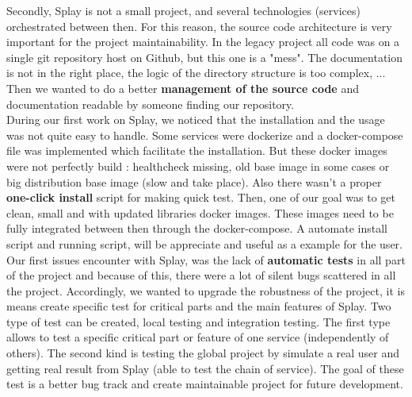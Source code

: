 \documentclass{eplmastersthesis}
\begin{document}
      Secondly, Splay is not a small project, and several technologies
      (services) orchestrated between then. For this reason, the source code
      architecture is very important for the project maintainability. In the
      legacy project all code was on a single git repository host on Github,
      but this one is a "mess". The documentation is not in the right place,
      the logic of the directory structure is too complex, ... Then we wanted
      to do a better \textbf{management of the source code} and documentation
      readable by someone finding our repository. \\

      During our first work on Splay, we noticed that the installation and the
      usage was not quite easy to handle. Some services were dockerize and a
      docker-compose file was implemented which facilitate the installation.
      But these docker images were not perfectly build : healthcheck missing,
      old base image in some cases or big distribution base image (slow and
      take place). Also there wasn't a proper \textbf{one-click install}
      script for making quick test. Then, one of our goal was to get clean,
      small and with updated libraries docker images. These images need to be
      fully integrated between then through the docker-compose. A automate
      install script and running script, will be appreciate and useful as a
      example for the user.\\

      Our first issues encounter with Splay, was the lack of
      \textbf{automatic tests} in all part of the project and because of this,
      there were a lot of silent bugs scattered in all the project.
      Accordingly, we wanted to upgrade the robustness of the project,
      it is means create specific test for critical parts and the main features
      of Splay. Two type of test can be created, local testing and integration
      testing. The first type allows to test a specific critical part or
      feature of one service (independently of others). The second kind is
      testing the global project by simulate a real user and getting real
      result from Splay (able to test the chain of service). The goal of these
      test is a better bug track and create maintainable project for future
      development.\\
\end{document}
